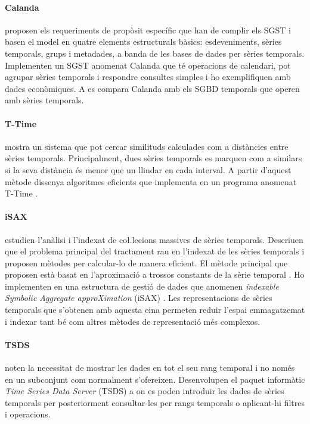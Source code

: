 \paragraph{Calanda} \textcite{dreyer94} proposen els requeriments de propòsit específic que han de complir els SGST i basen el model en quatre elements estructurals bàsics: esdeveniments, sèries temporals, grups i metadades, a banda de les bases de dades per sèries temporals. Implementen un SGST anomenat Calanda \parencite{dreyer94b,dreyer95,dreyer95b} que té operacions de calendari, pot agrupar sèries temporals i respondre consultes simples i ho exemplifiquen amb dades econòmiques. A \cite{schmidt95} es compara Calanda amb els SGBD temporals que operen amb sèries temporals. 




\paragraph{T-Time}  \textcite{assfalg08:thesis} mostra un sistema que pot cercar similituds calculades com a distàncies entre sèries temporals. Principalment, dues sèries temporals es marquen com a similars si la seva distància és menor que un llindar en cada interval. A partir d'aquest mètode dissenya algoritmes eficients que implementa en un programa anomenat T-Time \parencite{assfalg08:ttime}.


 
\paragraph{iSAX} \textcite{keogh08:isax,keogh10:isax} estudien l'anàlisi i l'indexat de co\l.lecions massives de sèries temporals. Descriuen que el problema principal del tractament rau en l'indexat de les sèries temporals i proposen mètodes per calcular-lo de manera eficient. El mètode principal que proposen està basat en l'aproximació a trossos constants de la sèrie temporal \parencite{keogh00}.  Ho implementen en una estructura de gestió de dades que anomenen \emph{indexable Symbolic Aggregate approXimation} (iSAX) \parencite{isax}. Les representacions de sèries temporals que s'obtenen amb aquesta eina permeten reduir l'espai emmagatzemat i indexar tant bé com altres mètodes de representació més complexos.




\paragraph{TSDS} \textcite{weigel10} noten la necessitat de mostrar les dades en tot el seu rang temporal i no només en un subconjunt com normalment s'ofereixen. Desenvolupen el paquet informàtic \emph{Time Series Data Server} (TSDS) \parencite{tsds} a on es poden introduir les dades de sèries temporals per posteriorment consultar-les per rangs temporals o aplicant-hi filtres i operacions.





